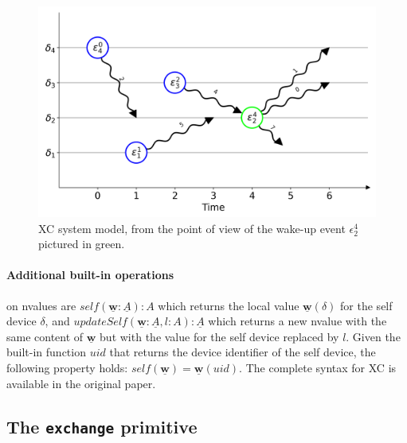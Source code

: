 \begin{figure}
    \centering
    \includegraphics[width=.8\linewidth]{figures/nvalues-example.png}
    \caption{\ac{XC} system model, from the point of view of the wake-up event $\epsilon_2^4$ pictured in green.}
    \label{fig:xc-nvalues-exampke}
\end{figure}

\paragraph{Additional built-in operations} on nvalues are $self(\underline{\mathbf{w}} : \underline{A}) : A$ which returns the local value $\underline{\mathbf{w}}(\delta)$ for the self device $\delta$, and $updateSelf(\underline{\mathbf{w}} : \underline{A}, l : A) : \underline{A}$ which returns a new nvalue with the same content of $\underline{\mathbf{w}}$ but with the value for the self device replaced by $l$\cite{xc}.
%
Given the built-in function $uid$ that returns the device identifier of the self device, the following property holds: $self(\underline{\mathbf{w}}) = \underline{\mathbf{w}}(uid)$.
%
The complete syntax for \ac{XC} is available in the original paper\cite[p. 4]{xc}.

\subsection{The \texttt{exchange} primitive}

